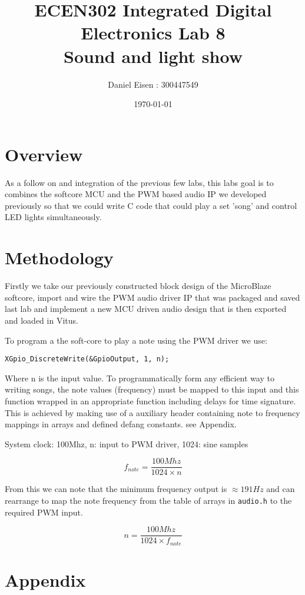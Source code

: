 \documentclass[11pt]{article}
\title{ECEN302 Integrated Digital Electronics Lab 8 \\ Sound and light show}
\author{Daniel Eisen : 300447549}
\date{\today}
\begin{document}
\begin{preview}
  \maketitle
  \section{Overview}
  As a follow on and integration of the previous few labs, this labs goal is to combines the softcore MCU and the PWM based audio IP we developed previously so that we could write C code that could play a set 'song' and control LED lights simultaneously.
  
  \section{Methodology}
  Firstly we take our previously constructed block design of the MicroBlaze softcore, import and wire the PWM audio driver IP that was packaged and saved last lab and implement a new MCU driven audio design that is then exported and loaded in Vitus. 

  To program a the soft-core to play a note using the PWM driver we use:
  \begin{center}
    \texttt{XGpio\_DiscreteWrite(\&GpioOutput, 1, n);}
  \end{center}
Where n is the input value. To programmatically form any efficient way to writing songs, the note values (frequency) must be mapped to this input and this function wrapped in an appropriate function including delays for time signature. This is achieved by making use of a auxiliary header containing note to frequency mappings in arrays and defined defang constants. see Appendix. 


  System clock: 100Mhz, n: input to PWM driver, 1024: sine samples

  $$f_{note} = \frac{100Mhz}{1024{\times}n}$$
  
  From this we can note that the minimum frequency output is $\approx 191Hz$ and can rearrange to map the note frequency from the table of arrays in \texttt{audio.h} to the required PWM input.

  $$n = \frac{100Mhz}{1024{\times}f_{note}}$$
  

  \section*{Appendix}
  

\end{preview}
\end{document}
